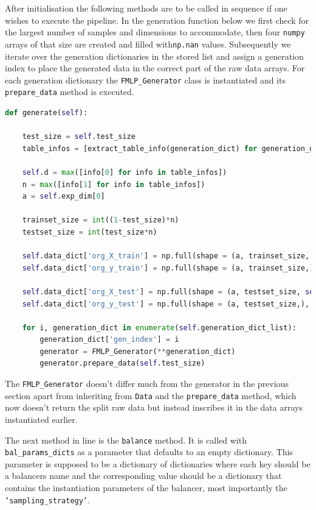After initialisation the following methods are to be called in sequence if one wishes to execute the pipeline. 
In the generation function below we first check for the largest number of samples and dimensions to accommodate, 
then four \texttt{numpy} arrays of that size are created and filled with\texttt{np.nan} values.
Subsequently we iterate over the generation dictionaries in the stored list and assign a generation index to place the generated data in the correct part of the raw data arrays.
For each generation dictionary the \texttt{FMLP\_Generator} class is instantiated and its \texttt{prepare\_data} method is executed.
\begin{lstlisting}[language=Python, numbers=none]
def generate(self):     

	test_size = self.test_size
	table_infos = [extract_table_info(generation_dict) for generation_dict in self.generation_dict_list]
	
	self.d = max([info[0] for info in table_infos])
	n = max([info[1] for info in table_infos])
	a = self.exp_dim[0]
	        
	trainset_size = int((1-test_size)*n)
	testset_size = int(test_size*n)
	
	self.data_dict['org_X_train'] = np.full(shape = (a, trainset_size, self.d), fill_value = np.nan)
	self.data_dict['org_y_train'] = np.full(shape = (a, trainset_size,), fill_value = np.nan)
	
	self.data_dict['org_X_test'] = np.full(shape = (a, testset_size, self.d), fill_value = np.nan)
	self.data_dict['org_y_test'] = np.full(shape = (a, testset_size,), fill_value = np.nan)
	
	for i, generation_dict in enumerate(self.generation_dict_list):
		generation_dict['gen_index'] = i
		generator = FMLP_Generator(**generation_dict)
		generator.prepare_data(self.test_size)
\end{lstlisting}

The \texttt{FMLP\_Generator} doesn't differ much from the generator in the previous section apart from inheriting from \texttt{Data} and the \texttt{prepare\_data} method,
which now doesn't return the split raw data but instead inscribes it in the data arrays instantiated earlier.

The next method in line is the \texttt{balance} method. It is called with \texttt{bal\_params\_dicts} as a parameter that defaults to an empty dictionary.
This parameter is supposed to be a dictionary of dictionaries where each key should be a balancers name and the corresponding value should be a dictionary 
that contains the instantiation parameters of the balancer, most importantly the \texttt{'sampling\_strategy'}.

